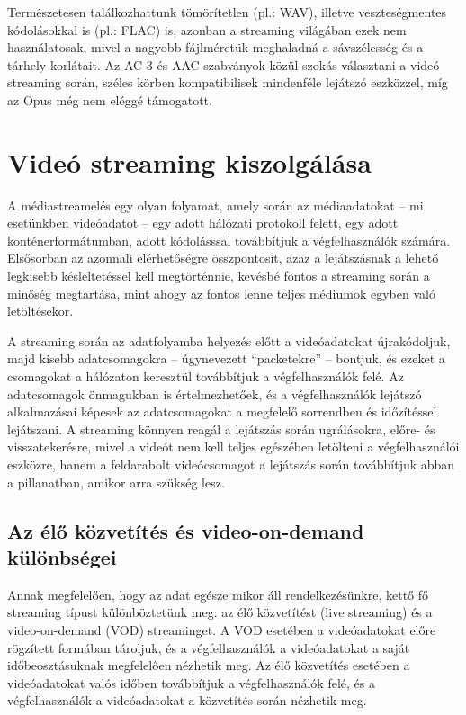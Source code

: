 Természetesen találkozhattunk tömörítetlen (pl.: WAV), illetve veszteségmentes kódolásokkal is (pl.: FLAC) is, azonban a streaming világában ezek nem használatosak, mivel a nagyobb fájlméretük meghaladná a sávszélesség és a tárhely korlátait. Az AC-3 és AAC szabványok közül szokás választani a videó streaming során, széles körben kompatibilisek mindenféle lejátszó eszközzel, míg az Opus még nem eléggé támogatott.

\section{Videó streaming kiszolgálása}\label{streamref}

A médiastreamelés egy olyan folyamat, amely során az médiaadatokat -- mi esetünkben videóadatot -- egy adott hálózati protokoll felett, egy adott konténerformátumban, adott kódolásssal továbbítjuk a végfelhasználók számára. Elsősorban az azonnali elérhetőségre összpontosít, azaz a lejátszásnak a lehető legkisebb késleltetéssel kell megtörténnie, kevésbé fontos a streaming során a minőség megtartása, mint ahogy az fontos lenne teljes médiumok egyben való letöltésekor.

A streaming során az adatfolyamba helyezés előtt a videóadatokat újrakódoljuk, majd kisebb adatcsomagokra -- úgynevezett ``packetekre'' -- bontjuk, és ezeket a csomagokat a hálózaton keresztül továbbítjuk a végfelhasználók felé. Az adatcsomagok önmagukban is értelmezhetőek, és a végfelhasználók lejátszó alkalmazásai képesek az adatcsomagokat a megfelelő sorrendben és időzítéssel lejátszani. A streaming könnyen reagál a lejátszás során ugrálásokra, előre- és visszatekerésre, mivel a videót nem kell teljes egészében letölteni a végfelhasználói eszközre, hanem a feldarabolt videócsomagot a lejátszás során továbbítjuk abban a pillanatban, amikor arra szükség lesz.

\subsection{Az élő közvetítés és video-on-demand különbségei}

Annak megfelelően, hogy az adat egésze mikor áll rendelkezésünkre, kettő fő streaming típust különböztetünk meg: az élő közvetítést (live streaming) és a video-on-demand (VOD) streaminget. A VOD esetében a videóadatokat előre rögzített formában tároljuk, és a végfelhasználók a videóadatokat a saját időbeosztásuknak megfelelően nézhetik meg. Az élő közvetítés esetében a videóadatokat valós időben továbbítjuk a végfelhasználók felé, és a végfelhasználók a videóadatokat a közvetítés során nézhetik meg.


